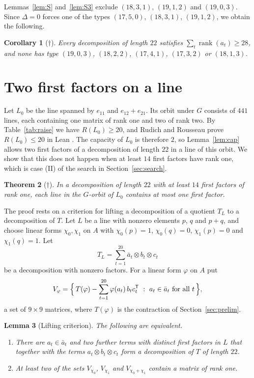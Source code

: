 \documentclass[11pt]{amsart}
\newtheorem{theorem}{Theorem}[section]
\newtheorem{lemma}[theorem]{Lemma}
\newtheorem{corollary}[theorem]{Corollary}
\theoremstyle{definition}
\theoremstyle{remark}
\numberwithin{equation}{section}
\newcommand{\rk}{\operatorname{rank}}
\begin{document}
Lemmas~\ref{lem:S} and~\ref{lem:S3} exclude $(18,3,1)$, $(19,1,2)$ and $(19,0,3)$. Since $\Delta=0$ forces one of the types $(17,5,0)$, $(18,3,1)$, $(19,1,2)$, we obtain the following.

\begin{corollary}[$\dagger$]\label{cor:types}
Every decomposition of length $22$ satisfies $\sum_t\rk(a_t)\ge 28$, and none has type $(19,0,3)$, $(18,2,2)$, $(17,4,1)$, $(17,3,2)$ or $(18,1,3)$.
\end{corollary}

\section{Two first factors on a line}\label{sec:l479}

Let $L_0$ be the line spanned by $e_{11}$ and $e_{12}+e_{21}$. Its orbit under $G$ consists of $441$ lines, each containing one matrix of rank one and two of rank two. By Table~\ref{tab:raise} we have $R(L_0)\ge 20$, and Rudich and Rousseau prove $R(L_0)\le 20$ in Lean \cite{RR26}. The capacity of $L_0$ is therefore $2$, so Lemma~\ref{lem:cap} allows two first factors of a decomposition of length $22$ in a line of this orbit. We show that this does not happen when at least $14$ first factors have rank one, which is case (II) of the search in Section~\ref{sec:search}.

\begin{theorem}[$\dagger$]\label{thm:l479}
In a decomposition of length $22$ with at least $14$ first factors of rank one, each line in the $G$-orbit of $L_0$ contains at most one first factor.
\end{theorem}

The proof rests on a criterion for lifting a decomposition of a quotient $T_L$ to a decomposition of $T$. Let $L$ be a line with nonzero elements $p$, $q$ and $p+q$, and choose linear forms $\chi_0,\chi_1$ on $A$ with $\chi_0(p)=1$, $\chi_0(q)=0$, $\chi_1(p)=0$ and $\chi_1(q)=1$. Let
\[
T_L=\sum_{t=1}^{20}\bar a_t\otimes b_t\otimes c_t
\]
be a decomposition with nonzero factors. For a linear form $\varphi$ on $A$ put
\[
V_\varphi=\Bigl\{\,T(\varphi)-\sum_{t=1}^{20}\varphi(a_t)\,b_tc_t^{\mathsf T}\ :\ a_t\in\bar a_t\text{ for all }t\,\Bigr\},
\]
a set of $9\times 9$ matrices, where $T(\varphi)$ is the contraction of Section~\ref{sec:prelim}.

\begin{lemma}[Lifting criterion]\label{lem:lift}
The following are equivalent.
\begin{enumerate}[label=(\alph*)]
\item There are $a_t\in\bar a_t$ and two further terms with distinct first factors in $L$ that together with the terms $a_t\otimes b_t\otimes c_t$ form a decomposition of $T$ of length $22$.
\item At least two of the sets $V_{\chi_0}$, $V_{\chi_1}$ and $V_{\chi_0+\chi_1}$ contain a matrix of rank one.
\end{enumerate}
\end{lemma}
\end{document}
